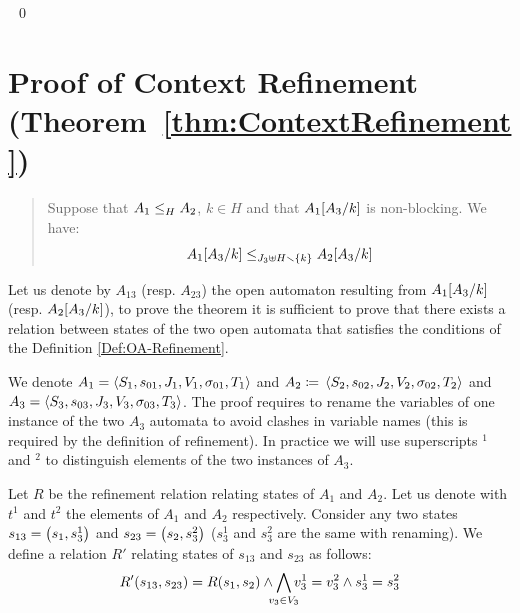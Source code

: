 \documentclass[runningheads]{llncs}
\begin{document}
\begin{enumerate}
\end{enumerate}

~\qed















\section{Proof of Context Refinement (Theorem~\ref{thm:ContextRefinement})}


\begin{quote}
Suppose that $\wrel{A_1}{A_2}{H}$, \(k \in H\) and that \(A_1\subst{A_3}{k}\) is non-blocking.
We have: \[\wrel{A_1\subst{A_3}{k}}{A_2\subst{A_3}{k}}{J_3 \uplus H \setminus \mbrc{k}}\]
\end{quote}


\proof
Let us denote by $A_{13}$ (resp. $A_{23}$) the open automaton resulting from $A_1\subst{A_3}{k}$ (resp. $A_2\subst{A_3}{k}$),  to prove the theorem it is sufficient to prove that there exists a relation between states of the two open automata that satisfies the conditions of the Definition \ref{Def:OA-Refinement}. 

We denote $A_1=  \OA{S_1}{s_{01}}{J_1}{V_1}{\sigma_{01}}{T_1}$ and \(A_2 \defobject \OA{S_2}{s_{02}}{J_2}{V_2}{\sigma_{02}}{T_2}\) and $A_3 = \OA{S_3}{s_{03}}{J_3}{V_3}{\sigma_{03}}{T_3}$. The proof requires  to rename the variables of one instance of the two $A_3$ automata to avoid clashes in variable names (this is required by the definition of refinement). In practice we will use superscripts ${}^1$ and ${}^2$ to distinguish elements of the two instances of $A_3$.

Let $R$ be the refinement relation relating states of $A_1$ and $A_2$. 
Let us denote with $t^1$ and $t^2$  the elements of $A_1$ and $A_2$ respectively.
Consider any two states $s_{13} = \mpar{s_1,s^1_3}$ and $s_{23} = \mpar{s_2,s^2_3}$ ($s^1_3$ and $s^2_3$  are the same with renaming). We define a relation $R'$ relating states of $s_{13}$ and $s_{23}$ as follows:
\[ R' \mpar{s_{13}, s_{23}} = R\mpar{s_{1}, s_{2}}  %
 \wedge \bigwedge_\subbox{v_3\in V_3}
 v^1_3=v^2_3\wedge s^1_3 = s^2_3\]
\end{document}

